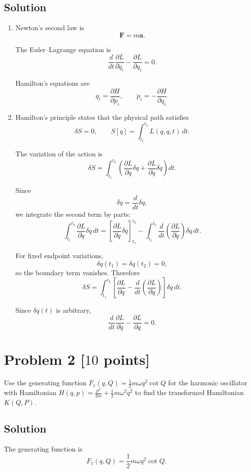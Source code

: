 \documentclass[11pt, a4paper]{article} %
\begin{document}
\subsection*{Solution}
\begin{enumerate}
\item[(1)] Newton's second law is
\[
\mathbf F=m\mathbf a.
\]

The Euler--Lagrange equation is
\[
\frac{d}{dt}\frac{\partial L}{\partial \dot q_i}
-
\frac{\partial L}{\partial q_i}
=0.
\]

Hamilton's equations are
\[
\dot q_i=\frac{\partial H}{\partial p_i},
\qquad
\dot p_i=-\frac{\partial H}{\partial q_i}.
\]

\item[(2)] Hamilton's principle states that the physical path satisfies
\[
\delta S=0,
\qquad
S[q]=\int_{t_1}^{t_2}L(q,\dot q,t)\,dt.
\]

The variation of the action is
\[
\delta S
=
\int_{t_1}^{t_2}
\left(
\frac{\partial L}{\partial q}\delta q
+
\frac{\partial L}{\partial \dot q}\delta \dot q
\right)dt.
\]

Since
\[
\delta \dot q=\frac{d}{dt}\delta q,
\]
we integrate the second term by parts:
\[
\int_{t_1}^{t_2}
\frac{\partial L}{\partial \dot q}\delta \dot q\,dt
=
\left[
\frac{\partial L}{\partial \dot q}\delta q
\right]_{t_1}^{t_2}
-
\int_{t_1}^{t_2}
\frac{d}{dt}\left(\frac{\partial L}{\partial \dot q}\right)
\delta q\,dt.
\]

For fixed endpoint variations,
\[
\delta q(t_1)=\delta q(t_2)=0,
\]
so the boundary term vanishes. Therefore
\[
\delta S
=
\int_{t_1}^{t_2}
\left[
\frac{\partial L}{\partial q}
-
\frac{d}{dt}\left(\frac{\partial L}{\partial \dot q}\right)
\right]\delta q\,dt.
\]

Since \(\delta q(t)\) is arbitrary,
\[
\boxed{
\frac{d}{dt}\frac{\partial L}{\partial \dot q}
-
\frac{\partial L}{\partial q}
=0.
}
\]

\end{enumerate}


\newpage
\section*{Problem 2 [$10$ points]}
Use the generating function $F_1(q,Q)=\frac{1}{2}m\omega q^2\cot Q$ for the harmonic oscillator with Hamiltonian $H(q,p)=\frac{p^2}{2m}+\frac{1}{2}m\omega^2q^2$ to find the transformed Hamiltonian $K(Q,P)$.

\subsection*{Solution}
The generating function is
\[
F_1(q,Q)=\frac12 m\omega q^2\cot Q.
\]
\end{document}

